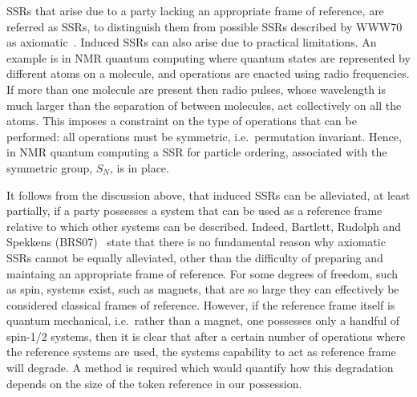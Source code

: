 
SSRs that arise due to a party lacking an appropriate frame of reference, are referred as  SSRs, to distinguish them from possible SSRs described by WWW70 as axiomatic~\cite{BRS07}.  Induced SSRs can also arise due to practical limitations.  An example is in NMR quantum computing where quantum states are represented by different atoms on a molecule, and operations are enacted using radio frequencies.  If more than one molecule are present then radio pulses, whose wavelength is much larger than the separation of between molecules, act collectively on all the atoms.  This imposes a constraint on the type of operations that can be performed: all operations must be symmetric, i.e.~permutation invariant.  Hence, in NMR quantum computing a SSR for particle ordering, associated with the symmetric group, $S_N$, is in place.

It follows from the discussion above, that induced SSRs can be alleviated, at least partially, if a party possesses a system that can be used as a reference frame relative to which other systems can be described. Indeed, Bartlett, Rudolph and Spekkens (BRS07)~\cite{BRS07} state that there is no fundamental reason why axiomatic SSRs cannot be equally alleviated, other than the difficulty of preparing and maintaing an appropriate frame of reference.  For some degrees of freedom, such as spin, systems exist, such as magnets, that are so large they can effectively be considered classical frames of reference.  However, if the reference frame itself is quantum mechanical, i.e.~rather than a magnet, one possesses only a handful of spin-1/2 systems, then it is clear that after a certain number of operations where the reference systems are used, the systems capability to act as reference frame will degrade.  A method is required which would quantify how this degradation depends on the size of the token reference in our possession.  

